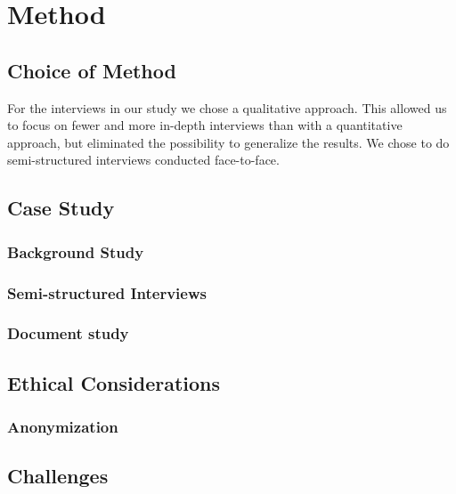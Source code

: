 \chapter{Method}

\section{Choice of Method}

For the interviews in our study we chose a qualitative approach. This allowed us to focus on fewer and more in-depth interviews than with a quantitative approach, but eliminated the possibility to generalize the results. We chose to do semi-structured interviews conducted face-to-face. 

\section{Case Study}
\subsection{Background Study}
\subsection{Semi-structured Interviews}
\subsection{Document study}

\section{Ethical Considerations}
\subsection{Anonymization}

\section{Challenges}